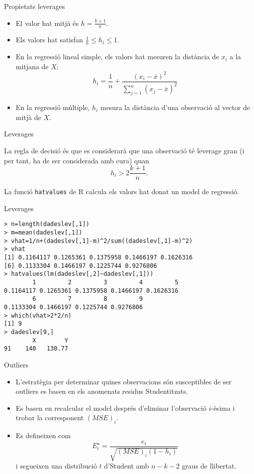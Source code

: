 \documentclass[12pt,t]{beamer}
\renewcommand{\emph}[1]{{\color{red}#1}}
\renewcommand{\leq}{\leqslant}
\theoremstyle{plain}
\theoremstyle{definition}
\begin{document}
\begin{frame}{Propietats leverages}

\begin{itemize}
\item El valor hat mitjà és $\overline{h}=\frac{k+1}{n}$.
\medskip
\item Els valors hat satisfan $\frac{1}{n}\leq h_i \leq 1$.
\medskip
\item En la regressió lineal simple, els valors hat mesuren la distància de $x_i$ a la mitjana de $X$:
$$h_i=\frac{1}{n}+\frac{(x_i-\overline{x})^2}{\sum_{j=1}^n{(x_j-\overline{x})^2}}$$
\medskip
\item En la regressió múltiple, $h_i$ mesura la distància d'una observació al vector de mitjà de $X$.
\end{itemize}
\end{frame}

\begin{frame}[fragile]{Leverages}

La regla de decisió és que es considerarà que una observació té leverage gran (i per tant, ha de ser considerada amb cura) quan $$h_i>2\frac{k+1}{n}.$$

La funció \texttt{hatvalues} de R calcula els valors hat donat un model de regressió.


\end{frame}


\begin{frame}[fragile]{Leverages}
\begin{footnotesize}

\begin{verbatim}
> n=length(dadeslev[,1])
> m=mean(dadeslev[,1])
> vhat=1/n+(dadeslev[,1]-m)^2/sum((dadeslev[,1]-m)^2)
> vhat
[1] 0.1164117 0.1265361 0.1375958 0.1466197 0.1626316 
[6] 0.1133304 0.1466197 0.1225744 0.9276806
> hatvalues(lm(dadeslev[,2]~dadeslev[,1]))
        1         2         3         4         5        
0.1164117 0.1265361 0.1375958 0.1466197 0.1626316 
        6         7         8         9 
0.1133304 0.1466197 0.1225744 0.9276806 
> which(vhat>2*2/n)
[1] 9
> dadeslev[9,]
        X        Y
91    140   130.77
\end{verbatim}

\end{footnotesize}
\end{frame}

\begin{frame}{Outliers}
\begin{itemize}
\item L'estratègia per determinar quines observacions són susceptibles de ser outliers es basen en els anomenats \emph{residus Studentitzats}. 
\item Es basen en recalcular el model després d'eliminar l'observació $i$-èsima i trobar la corresponent $(MSE)_i$.
\item Es defineixen com
$$E_i^\star=\frac{e_i}{\sqrt{(MSE)_i(1-h_i)}}$$
i segueixen una distribució $t$ d'Student amb $n-k-2$ graus de llibertat.
\end{itemize}
\end{frame}
\end{document}
